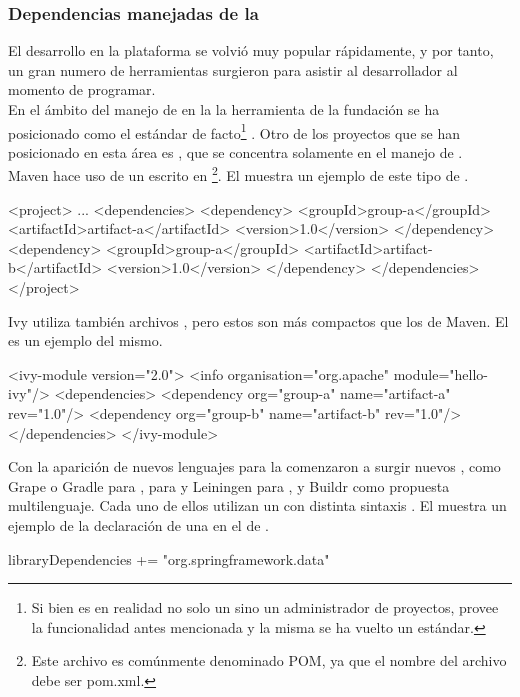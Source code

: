 \subsubsection{Dependencias manejadas de la \logictier}
\label{susubbsec:intro:jvm_dev:logic_dependencies}

El desarrollo en la plataforma \java se volvió muy popular rápidamente, y por tanto,
un gran numero de herramientas surgieron para asistir al desarrollador al momento
de programar.\\
En el ámbito del manejo de \dependencies en la \logictier la herramienta \maven
de la fundación \apache se ha posicionado como el estándar de facto\footnote{
	Si bien \apache \maven es en realidad no solo un \depmgr
	sino un administrador de proyectos, provee la funcionalidad antes mencionada y
	la misma se ha vuelto un estándar.
} . Otro de los proyectos que se han posicionado en esta área
es \apache \ivy, que se concentra solamente en el manejo de \dependencies.\\
Maven hace uso de un \conffile escrito en \xml\footnote{
	Este archivo es comúnmente denominado POM, ya que el nombre del archivo debe ser
	pom.xml.
}. El 
muestra un ejemplo de este tipo de \conffile.
\\
\begin{pomcode}[caption=Configuración de \dependencies en \maven mediante archivo POM,
	label=code:intro:jvm:maven_pom]
<project>
	...
	<dependencies>
		<dependency>
			<groupId>group-a</groupId>
			<artifactId>artifact-a</artifactId>
			<version>1.0</version>
		</dependency>
		<dependency>
			<groupId>group-a</groupId>
			<artifactId>artifact-b</artifactId>
			<version>1.0</version>
		</dependency>
	</dependencies>
</project>
\end{pomcode}

Ivy utiliza también archivos \xml, pero estos son más compactos que los de Maven.
El  es un ejemplo del mismo.
\\
\begin{ivycode}[caption=Archivo de configuración de Ivy,
	label=code:intro:jvm:ivy_modulue]
<ivy-module version="2.0">
	<info organisation="org.apache" module="hello-ivy"/>
	<dependencies>
		<dependency org="group-a" name="artifact-a" rev="1.0"/>
		<dependency org="group-b" name="artifact-b" rev="1.0"/>
	</dependencies>
</ivy-module>
\end{ivycode}

Con la aparición de nuevos lenguajes para la \jvm comenzaron a surgir nuevos
\depmgrs, como Grape o Gradle para \groovy, \sbt para \scala y
Leiningen para \clojure, y \apache Buildr como propuesta multilenguaje. Cada uno
de ellos utilizan un \conffile con
distinta sintaxis . El
 muestra un ejemplo de
la declaración de una \dependency en el \conffile de \sbt.
\\
\begin{javacode}[caption=Dependencia de SpringFramework 3.1.1 para \sbt,
	label=code:intro:jvm:sbt_module_add]
libraryDependencies += "org.springframework.data" %
\end{javacode}

